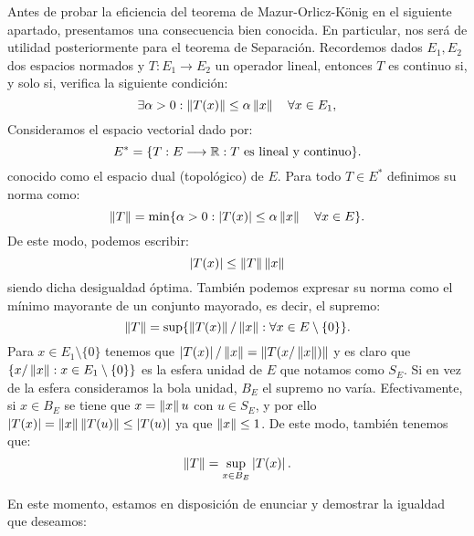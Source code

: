 \newcommand{\normSpace}{E}
Antes de probar la eficiencia del teorema de Mazur-Orlicz-König en el siguiente apartado, presentamos una consecuencia bien conocida. En particular, nos será de utilidad posteriormente para el teorema de Separación. Recordemos dados $ \normSpace_1, \normSpace_2 $ dos espacios normados y $ T:\normSpace_1 \longrightarrow \normSpace_2 $ un operador lineal, entonces $ T $ es continuo si, y solo si, verifica la siguiente condición:
\[
\exists \alpha > 0 : \norm{T(x)} \leq \alpha \norm{x} \quad \forall x \in \normSpace_1,
\]
Consideramos el espacio vectorial dado por:
\[
\normSpace^* =  \lbrace T:\normSpace \longrightarrow \RR: T \text{ es lineal y continuo} \rbrace.
\]
conocido como el espacio dual (topológico) de $ E $. Para todo $ T \in \normSpace^* $ definimos su norma como:
\[
\norm{T} = \min \lbrace \alpha > 0:  \abs{T(x)} \leq \alpha \norm{x} \quad \forall x \in \normSpace\rbrace.
\]
De este modo, podemos escribir:
\begin{equation*}\label{desigNorma}
\left\vert T(x)\right\vert \leq \left\Vert T\right\Vert \left\Vert x\right\Vert
\end{equation*}
siendo dicha desigualdad óptima. También podemos expresar su norma como el mínimo mayorante de un conjunto mayorado, es decir, el supremo:
\[
\norm{T} = \sup \lbrace \norm{T(x)}/\norm{x} : \forall x \in \normSpace \setminus \{0\}\rbrace.
\]
Para $  x \in \normSpace_1 \setminus \{0\} $ tenemos que $ \left\vert T(x)\right\vert/\left\Vert x\right\Vert = \left\Vert T(x/\left\Vert x\right\Vert)\right\Vert$ y es claro que $ \{ x/\norm{x} : x \in \normSpace_1 \setminus \{0\}\} $ es la esfera unidad de $ \normSpace $ que notamos como $ S_\normSpace $. Si en vez de la esfera consideramos la bola unidad, $ B_\normSpace $ el supremo no varía. Efectivamente, si $ x \in B_\normSpace  $ se tiene que $ x = \left\Vert x\right\Vert u $ con $ u \in  S_\normSpace$, y por ello $ \left\vert T(x)\right\vert = \left\Vert x\right\Vert\left\Vert T(u)\right\Vert \leq \left\vert T(u)\right\vert $ ya que $ \left\Vert x\right\Vert \leq 1 $. De este modo, también tenemos que:
\begin{equation*}\label{normSup}
\norm{T} =\sup_{x \in B_\normSpace} \abs{T(x)}.
\end{equation*}

En este momento, estamos en disposición de enunciar y demostrar la igualdad que deseamos:

